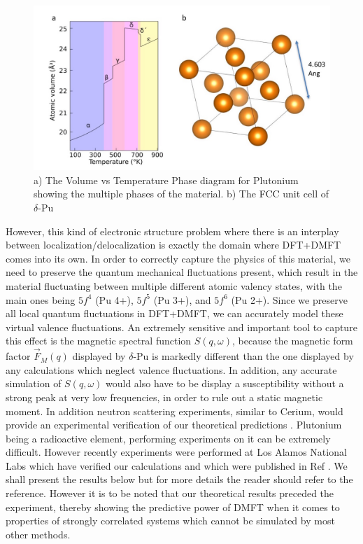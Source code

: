 \documentclass[10pt]{ruthesis}
\begin{document}
{\begin{figure}[H]
\begin{center}
\includegraphics[width=\columnwidth]{Pu_phase_and_struct.jpg}
\caption{ a) The Volume vs Temperature Phase diagram for Plutonium showing the multiple phases of the material. b) The FCC unit cell of $\delta$-Pu \label{Pu_phase}}

\end{center}
\end{figure}

However, this kind of electronic structure problem where there is an interplay between localization/delocalization is exactly the domain where DFT+DMFT comes into its own. In order to correctly capture the physics of this material, we need to preserve the quantum mechanical fluctuations present, which result in the material fluctuating between multiple different atomic valency states, with the main ones being $5f^4$ (Pu 4+), $5f^5$ (Pu 3+), and $5f^6$ (Pu 2+). Since we preserve all local quantum fluctuations in DFT+DMFT, we can accurately model these virtual valence fluctuations. An extremely sensitive and important tool to capture this effect is the magnetic spectral function $S(q,\omega)$, because the magnetic form factor $\vec{F}_M(q)$ displayed by $\delta$-Pu is markedly different than the one displayed by any calculations which neglect valence fluctuations. In addition, any accurate simulation of $S(q,\omega)$ would also have to be display a susceptibility without a strong peak at very low frequencies, in order to rule out a static magnetic moment. In addition neutron scattering experiments, similar to Cerium, would provide an experimental verification of our theoretical predictions  . Plutonium being a radioactive element, performing experiments on it can be extremely difficult. However recently experiments were performed at Los Alamos National Labs which have verified our calculations and which were published in Ref \cite{Me_Pu}. We shall present the results below but for more details the reader should refer to the reference. However it is to be noted that our theoretical results preceded the experiment, thereby showing the predictive power of DMFT when it comes to properties of strongly correlated systems which cannot be simulated by most other methods.


}
\end{document}
